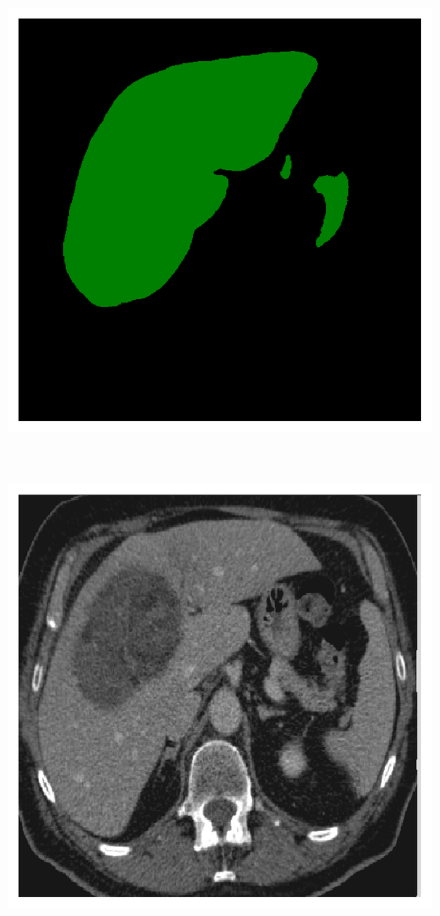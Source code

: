 \begin{figure}[!ht]
\begin{minipage}{4cm}
	\end{minipage} \hspace{-0.3cm}
	\begin{minipage}{4cm}
		\includegraphics[width=\linewidth]{images/ResizeLiverVE_Pred_Pat1_12}
	\end{minipage} \\
	\begin{minipage}{4cm}
		\includegraphics[width=\linewidth]{images/ResizeLiverVE_Raw_Pat6_6}

\end{minipage}
\end{figure}
